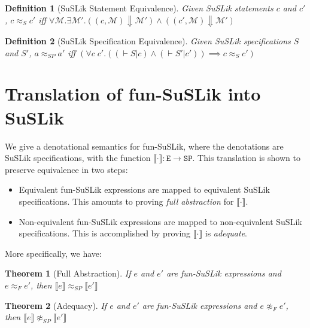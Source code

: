 \documentclass[10pt]{article}
\newtheorem{theorem}{Theorem}
\newtheorem{definition}{Definition}
\newcommand{\ttt}[1]{\texttt{#1}}
\newcommand{\ra}{\ensuremath{\rightarrow}}
\newcommand{\BigStep}{\ensuremath{\Downarrow}}
\newcommand{\sem} [1] {\llbracket#1\rrbracket}
\begin{document}
\noindent
\begin{definition}[SuSLik Statement Equivalence]
  Given SuSLik statements $c$ and $c'$, $c \approx_S c'$ iff
    $\forall \mathcal{M}. \exists \mathcal{M'}.
      ((c, \mathcal{M}) \BigStep \mathcal{M'})
      \land
      ((c', \mathcal{M}) \BigStep \mathcal{M'})$
\end{definition}

\begin{definition}[SuSLik Specification Equivalence]
  Given SuSLik specifications $S$ and $S'$, $a \approx_{SP} a'$ iff
    $(\forall c\; c'. ((\vdash S | c) \land (\vdash S' | c')) \implies c \approx_{S} c')$
\end{definition}

\section{Translation of fun-SuSLik into SuSLik}

We give a denotational semantics for fun-SuSLik, where the denotations are SuSLik specifications, with
the function $\sem{\cdot} : \ttt{E} \ra \ttt{SP}$.
This translation is shown to preserve equivalence in two steps:

\begin{itemize}
  \item Equivalent fun-SuSLik expressions are mapped to equivalent SuSLik specifications. This amounts to proving
    \textit{full abstraction} for $\sem{\cdot}$.
  \item Non-equivalent fun-SuSLik expressions are mapped to non-equivalent SuSLik specifications.
    This is accomplished by proving $\sem{\cdot}$ is \textit{adequate}.
\end{itemize}

\noindent
More specifically, we have:

\begin{theorem}[Full Abstraction]
  If $e$ and $e'$ are fun-SuSLik expressions and $e \approx_F e'$, then $\sem{e} \approx_{SP} \sem{e'}$
\end{theorem}

\begin{theorem}[Adequacy]
  If $e$ and $e'$ are fun-SuSLik expressions and $e \not\approx_F e'$, then $\sem{e} \not\approx_{SP} \sem{e'}$
\end{theorem}
\end{document}
